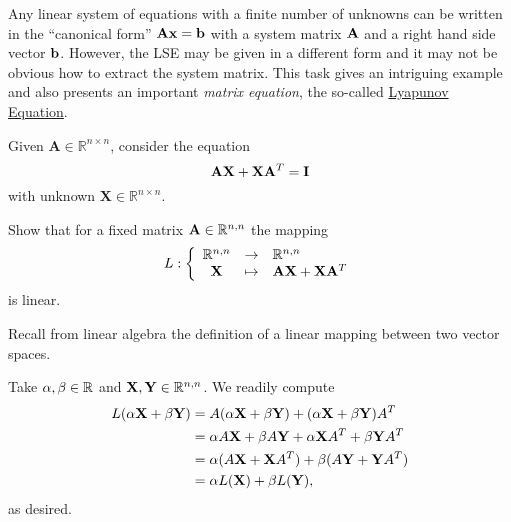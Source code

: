 


\begin{problem}\label{prb:Lyapunov}

  Any linear system of equations with a finite number of unknowns can be written in the
  ``canonical form'' ${\mathbf{A}}{\mathbf{x}}={\mathbf{b}}$ with a system matrix ${\mathbf{A}}$ and a right hand side
  vector ${\mathbf{b}}$. However, the LSE may be given in a different form and it may not be
  obvious how to extract the system matrix. This task gives an intriguing example
  and also presents an important \emph{matrix equation}, the so-called
  \href{http://en.wikipedia.org/wiki/Lyapunov_equation}{Lyapunov Equation}. 

  Given $\mathbf{A}\in \mathbb{R}^{n\times n}$, consider the equation
  \begin{equation}
    \label{eq:Lyapunov}
    {\mathbf{A}}{\mathbf{X}} + {\mathbf{X}}{\mathbf{A}}^{T} = {\mathbf{I}}
  \end{equation}
  with unknown $\mathbf{X}\in\mathbb{R}^{n\times n}$.

\begin{subproblem}[1]\label{lpy:sp:0}
Show that for a fixed matrix ${\mathbf{A}}\in\mathbb{R}^{n,n}$ the mapping 
\begin{gather*}
  L: \left\{
    \begin{array}[c]{ccl}
      \mathbb{R}^{n,n} & \to & \mathbb{R}^{n,n} \\
      {\mathbf{X}} & \mapsto & {\mathbf{A}}{\mathbf{X}} + {\mathbf{X}}{\mathbf{A}}^{T}
    \end{array}\right.
\end{gather*}
is linear.

\begin{hint}
  Recall from linear algebra the definition of a linear mapping between two vector spaces.
\end{hint}
  \begin{solution}
  Take $\alpha,\beta\in\mathbb{R}$ and ${\mathbf{X}},{\mathbf{Y}}\in\mathbb{R}^{n,n}$. We readily compute
  \[
  \begin{split}
  L(\alpha {\mathbf{X}}+\beta {\mathbf{Y}})&=A(\alpha {\mathbf{X}}+\beta {\mathbf{Y}})+(\alpha {\mathbf{X}}+\beta {\mathbf{Y}})A^T\\
  &=\alpha A {\mathbf{X}}+\beta A {\mathbf{Y}}+\alpha {\mathbf{X}} A^T +\beta {\mathbf{Y}} A^T\\
  &=\alpha (A {\mathbf{X}}+{\mathbf{X}} A^T)+\beta( A {\mathbf{Y}}+ {\mathbf{Y}} A^T)\\
  &=\alpha L({\mathbf{X}})+\beta L({\mathbf{Y}}),
  \end{split}
  \]
  as desired.
  \end{solution}
\end{subproblem}


\end{problem}
